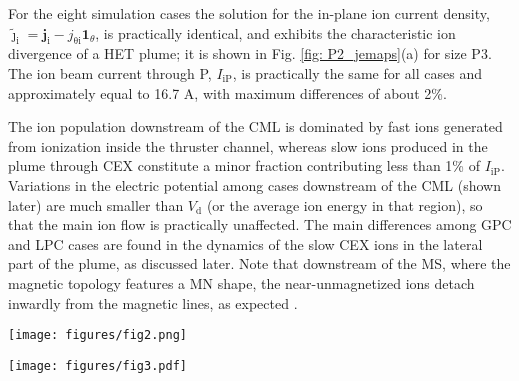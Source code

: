 \documentclass[%
 aip,
cha,
 amsmath,amssymb,
 reprint,%
]{revtex4-1}
\begin{document}
For the eight simulation cases the solution for the in-plane ion current density, $\bm{\tilde\jmath}_\mathrm{i} = \bm j_\mathrm{i} - j_\mathrm{\theta i}\bm 1_\theta$, is practically identical, and exhibits the characteristic ion divergence of a HET plume; it is shown in Fig. \ref{fig: P2_jemaps}(a) for size P3. 
%
The ion beam current through P, $I_\mathrm{iP}$, is practically the same for all cases and approximately equal to 16.7 A, with maximum differences of about 2\%.
%

The ion population downstream of the CML is dominated by fast ions generated from ionization inside the thruster channel, whereas slow ions produced in the plume through CEX constitute a minor fraction contributing less than 1\% of $I_\mathrm{iP}$. Variations in the electric potential among cases downstream of the CML (shown later) are much smaller than $V_\mathrm{d}$ (or the average ion energy in that region), so that the main ion flow is practically unaffected.
%
The main differences among GPC and LPC cases are found in the dynamics of the slow CEX ions in the lateral part of the plume, as discussed later.
%
Note that downstream of the MS, where the magnetic topology features a MN shape, the near-unmagnetized ions detach inwardly from the magnetic lines, as expected \cite{meri14a}.


\begin{figure*}[!pht]
\centering
\texttt{[image: figures/fig2.png]}
\caption{
Plume sizes P1-P3 with C1 (the white square marker at $z/L_\mathrm{c}=1$) and with LPC (top row) and GPC (bottom row). 2D ($z$,$r$) contour maps and streamlines of $\tilde {\bm  \jmath}$.}
\label{fig: j_comp_P1P4}
\end{figure*}

\begin{figure*}[!t]
\centering
\texttt{[image: figures/fig3.pdf]}
\caption{
2D ($z$,$r$) contour maps of (a) $\tilde {\bm  \jmath}_\mathrm{i}$ and (b) $\tilde {\bm  \jmath}_\mathrm{e}$ for case GP3C1, and (c) $\tilde {\bm  \jmath}_\mathrm{e}$ for case LP3C1. The black lines with arrows depict streamlines of $\tilde {\bm  \jmath}_\mathrm{i}$ in (a) and $-\tilde {\bm  \jmath}_\mathrm{e}$ in (b) and (c). Magenta lines indicate magnetic lines. The white square marker at $z/L_\mathrm{c}=1$ indicates the location of cathode C1.
}
\label{fig: P2_jemaps}
\end{figure*}
\end{document}
